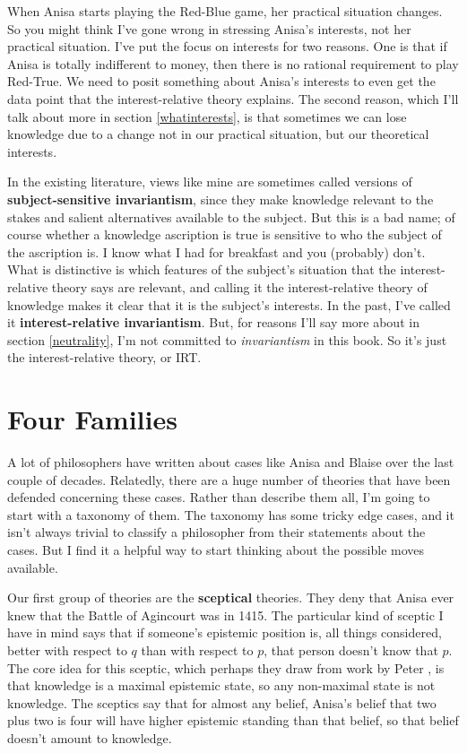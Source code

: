 \documentclass[11pt,]{book}
\begin{document}
When Anisa starts playing the Red-Blue game, her practical situation changes. So you might think I've gone wrong in stressing Anisa's interests, not her practical situation. I've put the focus on interests for two reasons. One is that if Anisa is totally indifferent to money, then there is no rational requirement to play Red-True. We need to posit something about Anisa's interests to even get the data point that the interest-relative theory explains. The second reason, which I'll talk about more in section \ref{whatinterests}, is that sometimes we can lose knowledge due to a change not in our practical situation, but our theoretical interests.

In the existing literature, views like mine are sometimes called versions of \textbf{subject-sensitive invariantism}, since they make knowledge relevant to the stakes and salient alternatives available to the subject. But this is a bad name; of course whether a knowledge ascription is true is sensitive to who the subject of the ascription is. I know what I had for breakfast and you (probably) don't. What is distinctive is which features of the subject's situation that the interest-relative theory says are relevant, and calling it the interest-relative theory of knowledge makes it clear that it is the subject's interests. In the past, I've called it \textbf{interest-relative invariantism}. But, for reasons I'll say more about in section \ref{neutrality}, I'm not committed to \emph{invariantism} in this book. So it's just the interest-relative theory, or IRT.

\hypertarget{fourfamilies}{%
\section{Four Families}\label{fourfamilies}}

A lot of philosophers have written about cases like Anisa and Blaise over the last couple of decades. Relatedly, there are a huge number of theories that have been defended concerning these cases. Rather than describe them all, I'm going to start with a taxonomy of them. The taxonomy has some tricky edge cases, and it isn't always trivial to classify a philosopher from their statements about the cases. But I find it a helpful way to start thinking about the possible moves available.

Our first group of theories are the \textbf{sceptical} theories. They deny that Anisa ever knew that the Battle of Agincourt was in 1415. The particular kind of sceptic I have in mind says that if someone's epistemic position is, all things considered, better with respect to \(q\) than with respect to \(p\), that person doesn't know that \(p\). The core idea for this sceptic, which perhaps they draw from work by Peter \citet{Unger1975}, is that knowledge is a maximal epistemic state, so any non-maximal state is not knowledge. The sceptics say that for almost any belief, Anisa's belief that two plus two is four will have higher epistemic standing than that belief, so that belief doesn't amount to knowledge.
\end{document}
